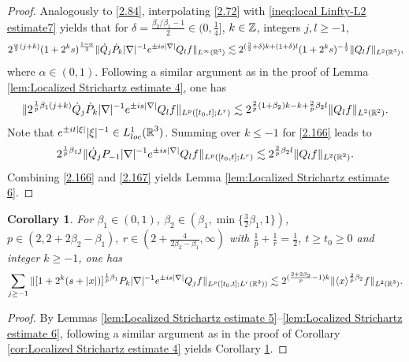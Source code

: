 \documentclass[11pt,twoside]{article}
\def\Z{\mathop{\mathbb Z\kern 0pt}\nolimits}
\def\R{\mathop{\mathbb R\kern 0pt}\nolimits}
\def\f{\frac}
\def\ls{\lesssim}
\newcommand{\w}[1]{\langle {#1} \rangle}
\newcommand{\pk}{\dot{P}_k}
\newcommand{\q}{\dot{Q}}
\theoremstyle{plain}
\newtheorem{cor}[theorem]{Corollary}
\theoremstyle{definition}
\numberwithin{equation}{section}
\begin{document}
	\begin{proof}
		Analogously to \eqref{2.84}, interpolating \eqref{2.72} with \eqref{ineq:local Linfty-L2 estimate7} yields
that for $\delta=\f{\beta_2/\beta_1-1}{2}\in(0,\f14]$, $k\in\Z$, integers $j, l\ge -1$,
		\begin{equation*}
			2^{\f{\alpha}{2}(j+k)}(1+2^ks)^{\f{1-\alpha}{2}}\|\q_j\pk|\nabla|^{-1}e^{\pm is|\nabla|}Q_lf\|_{L^\infty(\R^3)}
			\ls
			2^{(\f32+\delta)k+(1+\delta)l}(1+2^ks)^{-\f12}\|Q_l f\|_{L^2(\R^3)},
		\end{equation*}
		where $\alpha\in(0,1)$. Following a similar argument as in the proof of Lemma \ref{lem:Localized Strichartz estimate 4}, one has
		\begin{equation}\label{2.166}
			\begin{split}
				\|2^{\f1p \beta_1(j+k)}\q_j\pk |\nabla|^{-1}e^{\pm is|\nabla|}Q_lf\|_{L^p([t_0,t];L^r)}
				\ls
				2^{\f2p(1+\beta_2)k-k +\f2p\beta_2 l}\|Q_lf\|_{L^2(\R^2)}.
			\end{split}
		\end{equation}
		Note that $e^{\pm it|\xi|}|\xi|^{-1}\in L^1_{loc}(\R^3)$. Summing over $k\le -1$ for \eqref{2.166} leads to
		\begin{equation}\label{2.167}
			2^{\f1p \beta_1j}\|\q_jP_{-1}|\nabla|^{-1}e^{\pm is|\nabla|}Q_lf\|_{L^p([t_0,t];L^r)}
			\ls
			2^{\f2p\beta_2 l}\|Q_lf\|_{L^2(\R^2)}.
		\end{equation}
		Combining \eqref{2.166} and \eqref{2.167} yields Lemma \ref{lem:Localized Strichartz estimate 6}.
	\end{proof}
	\begin{cor}\label{cor:Localized Strichartz estimate 6}
For $\beta_1\in(0,1)$, $\beta_2\in(\beta_1,\min\{\f32\beta_1,1\})$, $p\in(2,2+2\beta_2-\beta_1),\ r\in(2+\f{4}{2\beta_2-\beta_1},\infty)$ with $\f1p+\f1r=\f12$, $t\ge t_0\ge 0$ and integer  $k\ge -1$, one has
			\begin{equation}\label{cor:local:Stric 6}
				\sum_{j\ge-1}\|[1+2^k(s+|x|)]^{\f{1}{p}\beta_1}P_{k}|\nabla|^{-1}e^{\pm is|\nabla|}Q_jf\|_{L^p([t_0,t];L^r(\R^3))}
				\ls
				2^{(\f{2+2\beta_2}{p}-1)k}\|\w{x}^{\f{2}{p}\beta_2}f\|_{L^2(\R^3)}.
		\end{equation}
	\end{cor}
	\begin{proof}
By Lemmas \ref{lem:Localized Strichartz estimate 5}--\ref{lem:Localized Strichartz estimate 6}, following a similar argument
as in the proof of Corollary \ref{cor:Localized Strichartz estimate 4} yields Corollary \ref{cor:Localized Strichartz estimate 6}.
	\end{proof}
\end{document}
